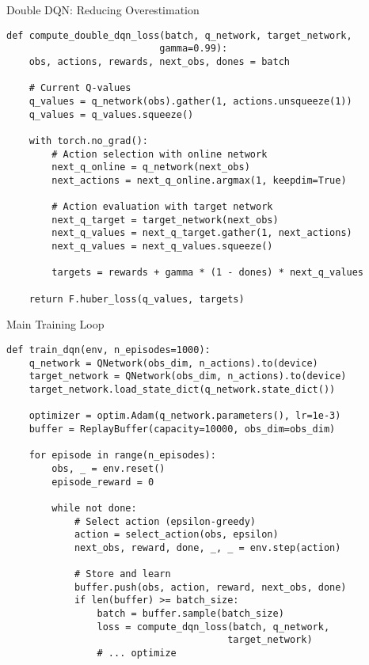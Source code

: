 \documentclass[aspectratio=169,10pt]{beamer}
\begin{document}
\begin{frame}[fragile]{Double DQN: Reducing Overestimation}
\begin{lstlisting}
def compute_double_dqn_loss(batch, q_network, target_network, 
                           gamma=0.99):
    obs, actions, rewards, next_obs, dones = batch
    
    # Current Q-values
    q_values = q_network(obs).gather(1, actions.unsqueeze(1))
    q_values = q_values.squeeze()
    
    with torch.no_grad():
        # Action selection with online network
        next_q_online = q_network(next_obs)
        next_actions = next_q_online.argmax(1, keepdim=True)
        
        # Action evaluation with target network
        next_q_target = target_network(next_obs)
        next_q_values = next_q_target.gather(1, next_actions)
        next_q_values = next_q_values.squeeze()
        
        targets = rewards + gamma * (1 - dones) * next_q_values

    return F.huber_loss(q_values, targets)
\end{lstlisting}
\end{frame}

\begin{frame}[fragile]{Main Training Loop}
\begin{lstlisting}
def train_dqn(env, n_episodes=1000):
    q_network = QNetwork(obs_dim, n_actions).to(device)
    target_network = QNetwork(obs_dim, n_actions).to(device)
    target_network.load_state_dict(q_network.state_dict())
    
    optimizer = optim.Adam(q_network.parameters(), lr=1e-3)
    buffer = ReplayBuffer(capacity=10000, obs_dim=obs_dim)
    
    for episode in range(n_episodes):
        obs, _ = env.reset()
        episode_reward = 0
        
        while not done:
            # Select action (epsilon-greedy)
            action = select_action(obs, epsilon)
            next_obs, reward, done, _, _ = env.step(action)
            
            # Store and learn
            buffer.push(obs, action, reward, next_obs, done)
            if len(buffer) >= batch_size:
                batch = buffer.sample(batch_size)
                loss = compute_dqn_loss(batch, q_network, 
                                       target_network)
                # ... optimize
\end{lstlisting}
\end{frame}
\end{document}
